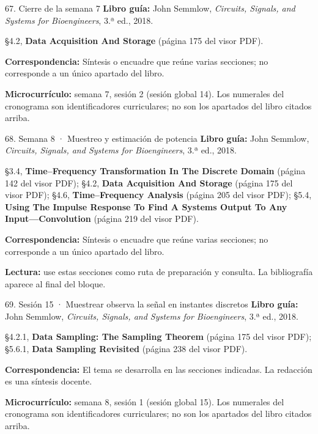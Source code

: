 \documentclass[
  10pt,
  ignorenonframetext,
  aspectratio=169,
  spanish,
]{beamer}
\begin{document}
\begin{frame}{67. Cierre de la semana 7}
\label{cierre-de-la-semana-7}
\textbf{Libro guía:} John Semmlow, \emph{Circuits, Signals, and Systems
for Bioengineers}, 3.ª ed., 2018.

§4.2, \textbf{Data Acquisition And Storage} (página 175 del visor PDF).

\textbf{Correspondencia:} Síntesis o encuadre que reúne varias
secciones; no corresponde a un único apartado del libro.

\textbf{Microcurrículo:} semana 7, sesión 2 (sesión global 14). Los
numerales del cronograma son identificadores curriculares; no son los
apartados del libro citados arriba.
\end{frame}

\begin{frame}{68. Semana 8 · Muestreo y estimación de potencia}
\label{semana-8-muestreo-y-estimaciuxf3n-de-potencia}
\textbf{Libro guía:} John Semmlow, \emph{Circuits, Signals, and Systems
for Bioengineers}, 3.ª ed., 2018.

§3.4, \textbf{Time--Frequency Transformation In The Discrete Domain}
(página 142 del visor PDF); §4.2, \textbf{Data Acquisition And Storage}
(página 175 del visor PDF); §4.6, \textbf{Time--Frequency Analysis}
(página 205 del visor PDF); §5.4, \textbf{Using The Impulse Response To
Find A Systems Output To Any Input---Convolution} (página 219 del visor
PDF).

\textbf{Correspondencia:} Síntesis o encuadre que reúne varias
secciones; no corresponde a un único apartado del libro.

\textbf{Lectura:} use estas secciones como ruta de preparación y
consulta. La bibliografía aparece al final del bloque.
\end{frame}

\begin{frame}{69. Sesión 15 · Muestrear observa la señal en instantes
discretos}
\label{sesiuxf3n-15-muestrear-observa-la-seuxf1al-en-instantes-discretos}
\textbf{Libro guía:} John Semmlow, \emph{Circuits, Signals, and Systems
for Bioengineers}, 3.ª ed., 2018.

§4.2.1, \textbf{Data Sampling: The Sampling Theorem} (página 175 del
visor PDF); §5.6.1, \textbf{Data Sampling Revisited} (página 238 del
visor PDF).

\textbf{Correspondencia:} El tema se desarrolla en las secciones
indicadas. La redacción es una síntesis docente.

\textbf{Microcurrículo:} semana 8, sesión 1 (sesión global 15). Los
numerales del cronograma son identificadores curriculares; no son los
apartados del libro citados arriba.
\end{frame}
\end{document}
